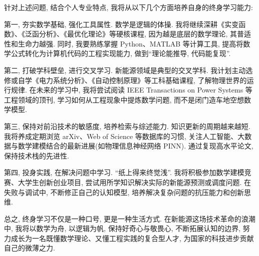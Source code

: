 \documentclass[a4paper,11pt,AutoFakeBold]{article}
\begin{document}
针对上述问题, 结合个人专业特点, 我将从以下几个方面培养自身的终身学习能力: 

第一, 夯实数学基础, 强化工具属性.  数学是逻辑的体操. 我将继续深耕《实变函数》、《泛函分析》、《最优化理论》等硬核课程, 因为越是底层的数学理论, 其普适性和生命力越强. 同时, 我要熟练掌握 Python、MATLAB 等计算工具, 提高将数学公式转化为计算机代码的工程实现能力, 做到“理论能推导, 代码能复现”. 

第二, 打破学科壁垒, 进行交叉学习.  新能源领域是典型的交叉学科. 我计划主动选修或自学《电力系统分析》、《自动控制原理》等工科基础课程, 了解物理世界的运行规律. 在未来的学习中, 我将尝试阅读 IEEE Transactions on Power Systems 等工程领域的顶刊, 学习如何从工程现象中提炼数学问题, 而不是闭门造车地空想数学模型. 

第三, 保持对前沿技术的敏感度, 培养检索与综述能力.  知识更新的周期越来越短. 我将养成定期浏览 arXiv、Web of Science 等数据库的习惯, 关注人工智能、大数据与数学建模结合的最新进展(如物理信息神经网络 PINN). 通过复现高水平论文, 保持技术栈的先进性. 

第四, 投身实践, 在解决问题中学习.  “纸上得来终觉浅”. 我将积极参加数学建模竞赛、大学生创新创业项目, 尝试用所学知识解决实际的新能源预测或调度问题. 在失败与调试中, 不断修正自己的认知模型, 培养解决复杂问题的抗压能力和创新思维. 

总之, 终身学习不仅是一种口号, 更是一种生活方式. 在新能源这场技术革命的浪潮中, 我将以数学为舟, 以逻辑为帆, 保持好奇心与敬畏心, 不断拓展认知的边界, 努力成长为一名既懂数学理论、又懂工程实践的复合型人才, 为国家的科技进步贡献自己的微薄之力. 
\end{document}
